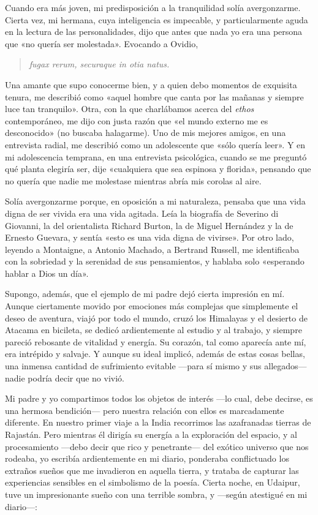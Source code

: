\documentclass[a4paper, 12pt]{article}
\begin{document}
Cuando era más joven, mi predisposición a la tranquilidad solía avergonzarme.
Cierta vez, mi hermana, cuya inteligencia es impecable, y particularmente aguda
en la lectura de las personalidades, dijo que antes que nada yo era una persona
que «no quería ser molestada». Evocando a Ovidio, 

\begin{quote}
    \textit{fugax rerum, securaque in otia natus.}
\end{quote}

Una amante que supo conocerme bien, y a quien debo momentos de exquisita tenura,
me describió como «aquel hombre que canta por las mañanas y siempre luce tan
tranquilo». Otra, con la que charlábamos acerca del \textit{ethos}
contemporáneo, me dijo con justa razón que «el mundo externo me es desconocido»
(no buscaba halagarme).
Uno de mis mejores amigos, en una entrevista radial, me describió como un
adolescente que «sólo quería leer». Y en mi adolescencia temprana, en una
entrevista psicológica, cuando se me preguntó qué planta elegiría ser, dije
«cualquiera que sea espinosa y florida», pensando que no quería que nadie me
molestase mientras abría mis corolas al aire.

Solía avergonzarme porque, en oposición a mi naturaleza, pensaba que una vida
digna de ser vivida era una vida agitada. Leía la biografía de Severino di
Giovanni, la del orientalista Richard Burton, la de Miguel Hernández y la de
Ernesto Guevara, y sentía «esto es una vida digna de vivirse». Por otro lado,
leyendo a Montaigne, a Antonio Machado, a Bertrand Russell, me identificaba con
la sobriedad y la serenidad de sus pensamientos, y hablaba solo «esperando
hablar a Dios un día».

Supongo, además, que el ejemplo de mi padre dejó cierta impresión en mí. Aunque
ciertamente movido por emociones más complejas que simplemente el deseo de
aventura, viajó por todo el mundo, cruzó los Himalayas y el
desierto de Atacama en bicileta, se dedicó ardientemente al estudio y al
trabajo, y siempre pareció rebosante de vitalidad y energía. Su corazón, tal
como aparecía ante mí, era intrépido y salvaje. Y aunque su ideal implicó,
además de estas cosas bellas, una inmensa cantidad de sufrimiento evitable
---para sí mismo y sus allegados--- nadie podría decir que no vivió.

Mi padre y yo compartimos todos los objetos de interés ---lo cual,
debe decirse, es una hermosa bendición--- pero nuestra relación con ellos es
marcadamente diferente. En nuestro primer viaje a la India recorrimos las
azafranadas tierras de Rajastán. Pero mientras él dirigía su energía a la
exploración del espacio, y al procesamiento ---debo decir que rico y
penetrante--- del exótico universo que nos rodeaba, yo escribía ardientemente en
mi diario, ponderaba conflictuado los extraños sueños que me invadieron en
aquella tierra, y trataba de capturar las experiencias sensibles en el
simbolismo de la poesía. Cierta noche, en Udaipur, tuve un impresionante sueño
con una terrible sombra, y ---según atestigué en mi diario---: 
\end{document}
